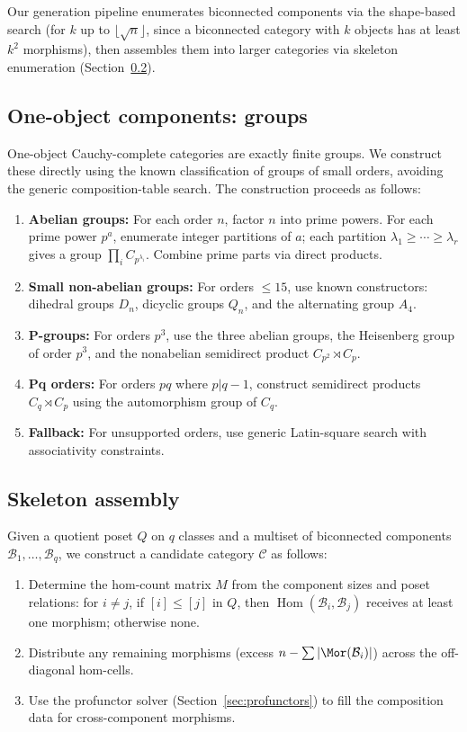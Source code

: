 \documentclass[12pt,a4paper]{amsart}
\theoremstyle{definition}
\theoremstyle{remark}
\newcommand{\cat}{\mathcal}
\newcommand{\Hom}{\operatorname{Hom}}
\begin{document}
Our generation pipeline enumerates biconnected components via the
shape-based search (for $k$ up to $\lfloor\sqrt{n}\rfloor$, since a
biconnected category with $k$ objects has at least $k^2$ morphisms), then
assembles them into larger categories via skeleton enumeration
(Section~\ref{sec:skeletons}).

\subsection{One-object components: groups}

One-object Cauchy-complete categories are exactly finite groups.  We
construct these directly using the known classification of groups of
small orders, avoiding the generic composition-table search.  The
construction proceeds as follows:

\begin{enumerate}
\item \textbf{Abelian groups:} For each order $n$, factor $n$ into prime
  powers.  For each prime power $p^a$, enumerate integer partitions of
  $a$; each partition $\lambda_1 \geq \cdots \geq \lambda_r$ gives a group
  $\prod_i C_{p^{\lambda_i}}$.  Combine prime parts via direct products.
\item \textbf{Small non-abelian groups:} For orders $\leq 15$, use known
  constructors: dihedral groups $D_n$, dicyclic groups $Q_n$, and the
  alternating group $A_4$.
\item \textbf{P-groups:} For orders $p^3$, use the three abelian groups,
  the Heisenberg group of order $p^3$, and the nonabelian semidirect
  product $C_{p^2} \rtimes C_p$.
\item \textbf{Pq orders:} For orders $pq$ where $p|q-1$, construct
  semidirect products $C_q \rtimes C_p$ using the automorphism group of
  $C_q$.
\item \textbf{Fallback:} For unsupported orders, use generic
  Latin-square search with associativity constraints.
\end{enumerate}

\subsection{Skeleton assembly}
\label{sec:skeletons}

Given a quotient poset $Q$ on $q$ classes and a multiset of biconnected
components $\cat{B}_1, \dots, \cat{B}_q$, we construct a candidate
category $\cat{C}$ as follows:
\begin{enumerate}
\item Determine the hom-count matrix $M$ from the component sizes and
  poset relations: for $i \neq j$, if $[i] \leq [j]$ in $Q$, then
  $\Hom(\cat{B}_i, \cat{B}_j)$ receives at least one morphism;
  otherwise none.
\item Distribute any remaining morphisms (excess $n - \sum |\Mor(\cat{B}_i)|$)
  across the off-diagonal hom-cells.
\item Use the profunctor solver (Section~\ref{sec:profunctors}) to fill
  the composition data for cross-component morphisms.
\end{enumerate}
\end{document}
